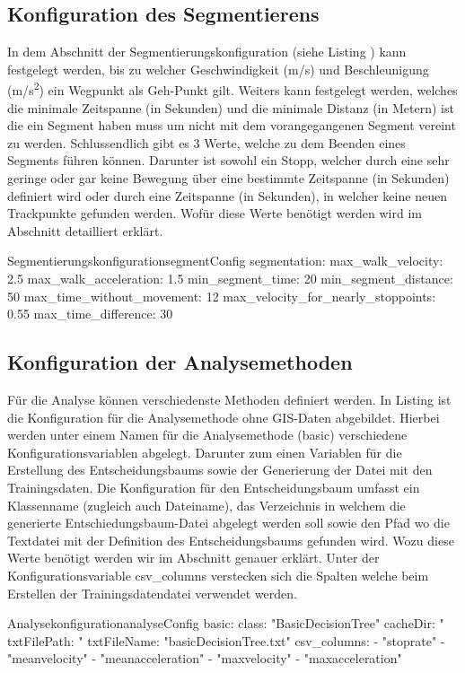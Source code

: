 \subsection{Konfiguration des Segmentierens}
In dem Abschnitt der Segmentierungskonfiguration (siehe Listing ) kann festgelegt werden, bis zu welcher Geschwindigkeit (m/s) und Beschleunigung (m/s\textsuperscript{2}) ein Wegpunkt als Geh-Punkt gilt. Weiters kann festgelegt werden, welches die minimale Zeitspanne (in Sekunden) und die minimale Distanz (in Metern) ist die ein Segment haben muss um nicht mit dem vorangegangenen Segment vereint zu werden. Schlussendlich gibt es 3 Werte, welche zu dem Beenden eines Segments führen können. Darunter ist sowohl ein Stopp, welcher durch eine sehr geringe oder gar keine Bewegung über eine bestimmte Zeitspanne (in Sekunden) definiert wird oder durch eine Zeitspanne (in Sekunden), in welcher keine neuen Trackpunkte gefunden werden. Wofür diese Werte benötigt werden wird im Abschnitt  detailliert erklärt.

\begin{code}[]{Segmentierungskonfiguration}{segmentConfig}
  segmentation:
    max_walk_velocity: 2.5
    max_walk_acceleration: 1.5
    min_segment_time: 20
    min_segment_distance: 50
    max_time_without_movement: 12
    max_velocity_for_nearly_stoppoints: 0.55
    max_time_difference: 30
\end{code}

\subsection{Konfiguration der Analysemethoden}
Für die Analyse können verschiedenste Methoden definiert werden. In Listing  ist die Konfiguration für die Analysemethode ohne GIS-Daten abgebildet. Hierbei werden unter einem Namen für die Analysemethode (basic) verschiedene Konfigurationsvariablen abgelegt. Darunter zum einen Variablen für die Erstellung des Entscheidungsbaums sowie der Generierung der Datei mit den Trainingsdaten. Die Konfiguration für den Entscheidungsbaum umfasst ein Klassenname (zugleich auch Dateiname), das Verzeichnis in welchem die generierte Entschiedungsbaum-Datei abgelegt werden soll sowie den Pfad wo die Textdatei mit der Definition des Entscheidungsbaums gefunden wird. Wozu diese Werte benötigt werden wir im Abschnitt  genauer erklärt. Unter der Konfigurationsvariable csv\_columns verstecken sich die Spalten welche beim Erstellen der Trainingsdatendatei verwendet werden.

\begin{code}[]{Analysekonfiguration}{analyseConfig}
    basic:
      class: "BasicDecisionTree"
      cacheDir: "%
      txtFilePath: "%
      txtFileName: "basicDecisionTree.txt"
      csv_columns:
        - "stoprate"
        - "meanvelocity"
        - "meanacceleration"
        - "maxvelocity"
        - "maxacceleration"
\end{code}